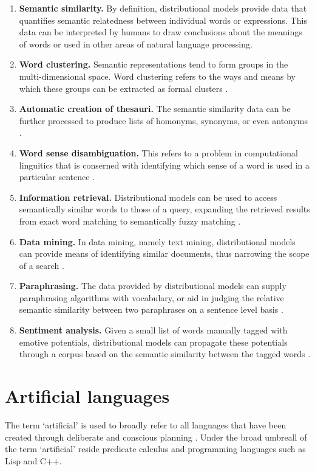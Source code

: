 \documentclass[14pt, a4paper]{extreport}
\begin{document}
\begin{enumerate}
  \item \textbf{Semantic similarity.} By definition, distributional models provide data that quantifies semantic relatedness between individual words or expressions. This data can be interpreted by humans to draw conclusions about the meanings of words or used in other areas of natural language processing.
  \item \textbf{Word clustering.} Semantic representations tend to form groups in the multi-dimensional space. Word clustering refers to the ways and means by which these groups can be extracted as formal clusters \parencite{bekkerman}.
  \item \textbf{Automatic creation of thesauri.} The semantic similarity data can be further processed to produce lists of homonyms, synonyms, or even antonyms \parencite{henestroza}.
  \item \textbf{Word sense disambiguation.} This refers to a problem in computational linguitics that is conserned with identifying which sense of a word is used in a particular sentence \parencite{musto}.
  \item \textbf{Information retrieval.} Distributional models can be used to access semantically similar words to those of a query, expanding the retrieved results from exact word matching to semantically fuzzy matching \parencite{silva}.
  \item \textbf{Data mining.} In data mining, namely text mining, distributional models can provide means of identifying similar documents, thus narrowing the scope of a search \parencite[89]{dalianis}.
  \item \textbf{Paraphrasing.} The data provided by distributional models can supply paraphrasing algorithms with vocabulary, or aid in judging the relative semantic similarity between two paraphrases on a sentence level basis \parencite{desouki}.
  \item \textbf{Sentiment analysis.} Given a small list of words manually tagged with emotive potentials, distributional models can propagate these potentials through a corpus based on the semantic similarity between the tagged words \parencite{alshari}.
\end{enumerate}


  \section{Artificial languages}
The term `artificial' is used to broadly refer to all languages that have been created through deliberate and conscious planning \parencite[41]{stria}. Under the broad umbreall of the term `artificial' reside predicate calculus and programming languages such as Lisp and C++.
\end{document}
